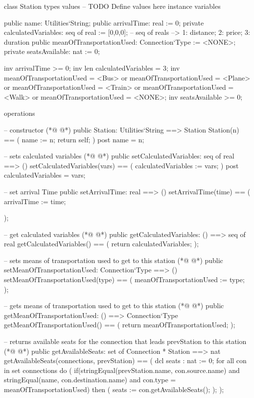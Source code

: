 \begin{vdmpp}[breaklines=true]
class Station
types
values
-- TODO Define values here
instance variables
 
 public name: Utilities`String;
 public arrivalTime: real := 0;
 private calculatedVariables: seq of real := [0,0,0]; -- seq of reals --> 1: distance; 2: price; 3: duration
 public meanOfTransportationUsed: Connection`Type := <NONE>;
 private seatsAvailable: nat := 0;

 inv arrivalTime >= 0;
  inv len calculatedVariables = 3;
  inv meanOfTransportationUsed = <Bus> or meanOfTransportationUsed = <Plane> or
      meanOfTransportationUsed = <Train> or meanOfTransportationUsed = <Walk> or meanOfTransportationUsed = <NONE>;
 inv seatsAvailable >= 0;

   
operations
 
 -- constructor
(*@
\label{Station:23}
@*)
 public Station: Utilities`String ==> Station
 Station(n) ==
 (
  name := n;  
  return self;
 )
 post name = n;
 
 -- sets calculated variables 
(*@
\label{setCalculatedVariables:32}
@*)
 public setCalculatedVariables: seq of real ==> ()
 setCalculatedVariables(vars) ==
 (
  calculatedVariables := vars;
 )
 post calculatedVariables = vars;
 
 -- set arrival Time
 public setArrivalTime: real ==> ()
 setArrivalTime(time) ==
 (
  arrivalTime := time;
  
 );
  
 -- get calculated variables
(*@
\label{getCalculatedVariables:48}
@*)
 public getCalculatedVariables: () ==> seq of real
 getCalculatedVariables() ==
 (
  return calculatedVariables;
 );
 
 -- sets means of transportation used to get to this station
(*@
\label{setMeanOfTransportationUsed:55}
@*)
 public setMeanOfTransportationUsed: Connection`Type ==> ()
 setMeanOfTransportationUsed(type) ==
 (
  meanOfTransportationUsed := type;
 );
 
 -- gets means of transportation used to get to this station
(*@
\label{getMeanOfTransportationUsed:62}
@*)
 public getMeanOfTransportationUsed: () ==> Connection`Type
 getMeanOfTransportationUsed() ==
 (
  return meanOfTransportationUsed;
 );

 -- returns available seats for the connection that leads prevStation to this station
(*@
\label{getAvailableSeats:69}
@*)
 public getAvailableSeats: set of Connection * Station ==> nat
 getAvailableSeats(connections, prevStation) ==
 (
  dcl seats : nat := 0;
  for all con in set connections do (
   if(stringEqual(prevStation.name, con.source.name) and stringEqual(name, con.destination.name) and con.type = meanOfTransportationUsed) then (
    seats := con.getAvailableSeats();
   );
  );
  

\end{vdmpp}
